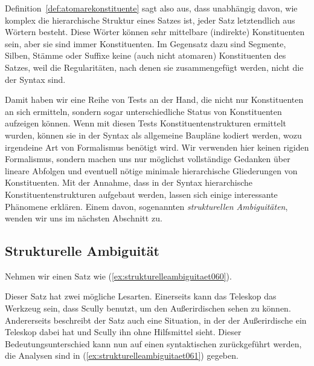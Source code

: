 
Definition~\ref{def:atomarekonstituente} sagt also aus, dass unabhängig davon, wie komplex die hierarchische Struktur eines Satzes ist, jeder Satz letztendlich aus Wörtern besteht.
Diese Wörter können sehr mittelbare (indirekte) Konstituenten sein, aber sie sind immer Konstituenten.
Im Gegensatz dazu sind Segmente, Silben, Stämme oder Suffixe keine (auch nicht atomaren) Konstituenten des Satzes, weil die Regularitäten, nach denen sie zusammengefügt werden, nicht die der Syntax sind.

Damit haben wir eine Reihe von Tests an der Hand, die nicht nur Konstituenten an sich ermitteln, sondern sogar unterschiedliche Status von Konstituenten aufzeigen können.
Wenn mit diesen Tests Konstituentenstrukturen ermittelt wurden, können sie in der Syntax als allgemeine Baupläne kodiert werden, wozu irgendeine Art von Formalismus benötigt wird.
Wir verwenden hier keinen rigiden Formalismus, sondern machen uns nur möglichst vollständige Gedanken über lineare Abfolgen und eventuell nötige minimale hierarchische Gliederungen von Konstituenten.
Mit der Annahme, dass in der Syntax hierarchische Konstituentenstrukturen aufgebaut werden, lassen sich einige interessante Phänomene erklären.
Einem davon, sogenannten \textit{strukturellen Ambiguitäten}, wenden wir uns im nächsten Abschnitt zu.

\subsection{Strukturelle Ambiguität}
\label{sec:strukturelleambiguitaet}

Nehmen wir einen Satz wie (\ref{ex:strukturelleambiguitaet060}).

\begin{exe}
\end{exe}

Dieser Satz hat zwei mögliche Lesarten.
Einerseits kann das Teleskop das Werkzeug sein, dass Scully benutzt, um den Außerirdischen sehen zu können.
Andererseits beschreibt der Satz auch eine Situation, in der der Außerirdische ein Teleskop dabei hat und Scully ihn ohne Hilfsmittel sieht.
Dieser Bedeutungsunterschied kann nun auf einen syntaktischen zurückgeführt werden, die Analysen sind in (\ref{ex:strukturelleambiguitaet061}) gegeben.


